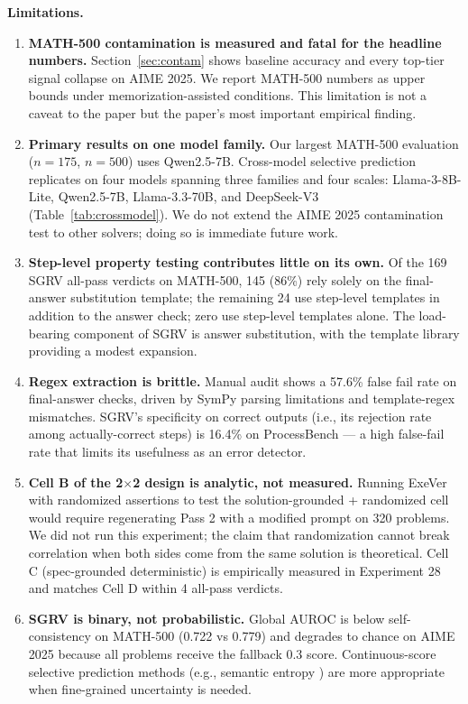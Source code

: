 \documentclass{article}
\begin{document}
\textbf{Limitations.}
\begin{enumerate}[leftmargin=*,itemsep=1pt]
\item \textbf{MATH-500 contamination is measured and fatal for the headline numbers.} Section~\ref{sec:contam} shows baseline accuracy and every top-tier signal collapse on AIME 2025. We report MATH-500 numbers as upper bounds under memorization-assisted conditions. This limitation is not a caveat to the paper but the paper's most important empirical finding.
\item \textbf{Primary results on one model family.} Our largest MATH-500 evaluation ($n=175$, $n=500$) uses Qwen2.5-7B. Cross-model selective prediction replicates on four models spanning three families and four scales: Llama-3-8B-Lite, Qwen2.5-7B, Llama-3.3-70B, and DeepSeek-V3 (Table~\ref{tab:crossmodel}). We do not extend the AIME 2025 contamination test to other solvers; doing so is immediate future work.
\item \textbf{Step-level property testing contributes little on its own.} Of the 169 SGRV all-pass verdicts on MATH-500, 145 (86\%) rely solely on the final-answer substitution template; the remaining 24 use step-level templates in addition to the answer check; zero use step-level templates alone. The load-bearing component of SGRV is answer substitution, with the template library providing a modest expansion.
\item \textbf{Regex extraction is brittle.} Manual audit shows a 57.6\% false fail rate on final-answer checks, driven by SymPy parsing limitations and template-regex mismatches. SGRV's specificity on correct outputs (i.e., its rejection rate among actually-correct steps) is 16.4\% on ProcessBench --- a high false-fail rate that limits its usefulness as an error detector.
\item \textbf{Cell B of the 2$\times$2 design is analytic, not measured.} Running ExeVer with randomized assertions to test the solution-grounded + randomized cell would require regenerating Pass 2 with a modified prompt on 320 problems. We did not run this experiment; the claim that randomization cannot break correlation when both sides come from the same solution is theoretical. Cell C (spec-grounded deterministic) is empirically measured in Experiment 28 and matches Cell D within 4 all-pass verdicts.
\item \textbf{SGRV is binary, not probabilistic.} Global AUROC is below self-consistency on MATH-500 (0.722 vs 0.779) and degrades to chance on AIME 2025 because all problems receive the fallback 0.3 score. Continuous-score selective prediction methods (e.g., semantic entropy \citep{kuhn2023semantic}) are more appropriate when fine-grained uncertainty is needed.

\end{enumerate}
\end{document}
